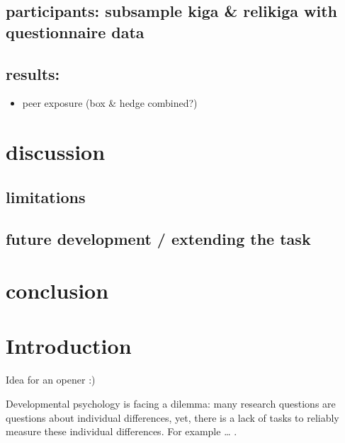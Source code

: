 \documentclass[
  man,floatsintext]{apa6}
\providecommand{\tightlist}{%
  \setlength{\itemsep}{0pt}\setlength{\parskip}{0pt}}
\begin{document}
\hypertarget{participants-subsample-kiga-relikiga-with-questionnaire-data}{%
\subsection{participants: subsample kiga \& relikiga with questionnaire data}\label{participants-subsample-kiga-relikiga-with-questionnaire-data}}

\hypertarget{results-2}{%
\subsection{results:}\label{results-2}}

\begin{itemize}
\tightlist
\item
  peer exposure (box \& hedge combined?)
\end{itemize}

\hypertarget{discussion}{%
\section{discussion}\label{discussion}}

\hypertarget{limitations}{%
\subsection{limitations}\label{limitations}}

\hypertarget{future-development-extending-the-task}{%
\subsection{future development / extending the task}\label{future-development-extending-the-task}}

\hypertarget{conclusion}{%
\section{conclusion}\label{conclusion}}

\newpage

\hypertarget{introduction}{%
\section{Introduction}\label{introduction}}

Idea for an opener :)

Developmental psychology is facing a dilemma: many research questions are questions about individual differences, yet, there is a lack of tasks to reliably measure these individual differences. For example \ldots{} .
\end{document}

